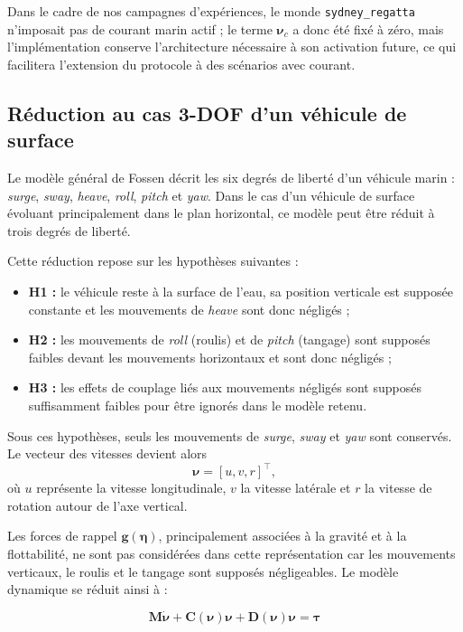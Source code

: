 \documentclass{rapportEILCO}
\begin{document}
	Dans le cadre de nos campagnes d'expériences, le monde \texttt{sydney\_regatta} n'imposait pas de courant marin actif ; le terme
	$\boldsymbol{\nu}_c$ a donc été fixé à zéro, mais l'implémentation conserve
	l'architecture nécessaire à son activation future, ce qui facilitera l'extension du protocole à des
	scénarios avec courant.
	
\subsection{Réduction au cas 3-DOF d'un véhicule de surface}
\label{sec:3dof}

Le modèle général de Fossen décrit les six degrés de liberté d'un véhicule marin :
\emph{surge}, \emph{sway}, \emph{heave}, \emph{roll}, \emph{pitch} et \emph{yaw}.
Dans le cas d'un véhicule de surface évoluant principalement dans le plan horizontal, ce modèle peut être réduit à trois degrés de liberté.

Cette réduction repose sur les hypothèses suivantes :
\begin{itemize}
	\item \textbf{H1 :} le véhicule reste à la surface de l'eau, sa position verticale est supposée constante et les mouvements de \emph{heave} sont donc négligés ;
	\item \textbf{H2 :} les mouvements de \emph{roll} (roulis) et de \emph{pitch} (tangage) sont supposés faibles devant les mouvements horizontaux et sont donc négligés ;
	\item \textbf{H3 :} les effets de couplage liés aux mouvements négligés sont supposés suffisamment faibles pour être ignorés dans le modèle retenu.
\end{itemize}

Sous ces hypothèses, seuls les mouvements de \emph{surge}, \emph{sway} et \emph{yaw} sont conservés. Le vecteur des vitesses devient alors
\begin{equation}
	\boldsymbol{\nu} =
	[u,v,r]^\top,
\end{equation}
où $u$ représente la vitesse longitudinale, $v$ la vitesse latérale et $r$ la vitesse de rotation autour de l'axe vertical.

Les forces de rappel $\boldsymbol{g}(\boldsymbol{\eta})$, principalement associées à la gravité et à la flottabilité, ne sont pas considérées dans cette représentation car les mouvements verticaux, le roulis et le tangage sont supposés négligeables. Le modèle dynamique se réduit ainsi à :

\begin{equation}
	\boldsymbol{M}\dot{\boldsymbol{\nu}}
	+
	\boldsymbol{C}(\boldsymbol{\nu})\boldsymbol{\nu}
	+
	\boldsymbol{D}(\boldsymbol{\nu})\boldsymbol{\nu}
	=
	\boldsymbol{\tau}
	\label{eq:fossen3dof}
\end{equation}
\end{document}
